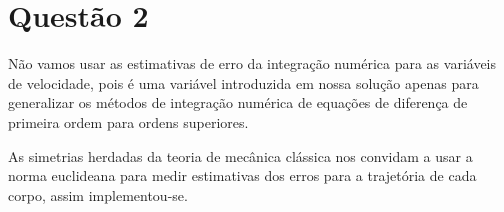 \documentclass[12pt,runningheads]{article}
\begin{document}
\newpage

\section{Questão 2}
Não vamos usar as estimativas de erro da integração numérica para as variáveis de velocidade, pois é uma variável introduzida em nossa solução apenas para generalizar os métodos de integração numérica de equações de diferença de primeira ordem para ordens superiores.

As simetrias herdadas da teoria de mecânica clássica nos convidam a usar a norma euclideana para medir estimativas dos erros para a trajetória de cada corpo, assim implementou-se.
\end{document}
